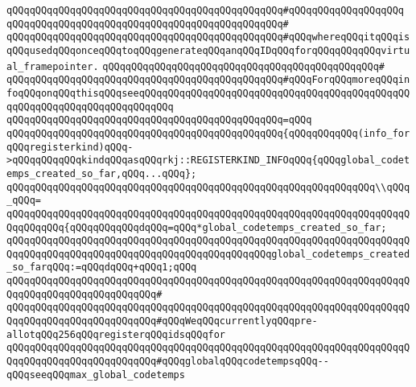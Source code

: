 \verb|qQQqqQQqqQQqqQQqqQQqqQQqqQQqqQQqqQQqqQQqqQQqqQQq#qQQqqQQqqQQqqQQqqQQq|\newline
\verb|qQQqqQQqqQQqqQQqqQQqqQQqqQQqqQQqqQQqqQQqqQQqqQQq#|\newline
\verb|qQQqqQQqqQQqqQQqqQQqqQQqqQQqqQQqqQQqqQQqqQQqqQQq#qQQqwhereqQQqitqQQqisqQQqusedqQQqonceqQQqtoqQQqgenerateqQQqanqQQqIDqQQqforqQQqqQQqqQQqvirtual_framepointer.|\newline
\verb|qQQqqQQqqQQqqQQqqQQqqQQqqQQqqQQqqQQqqQQqqQQqqQQq#|\newline
\verb|qQQqqQQqqQQqqQQqqQQqqQQqqQQqqQQqqQQqqQQqqQQqqQQq#qQQqForqQQqmoreqQQqinfoqQQqonqQQqthisqQQqseeqQQqqQQqqQQqqQQqqQQqqQQqqQQqqQQqqQQqqQQqqQQqqQQqqQQqqQQqqQQqqQQqqQQqqQQqqQQq|\newline
\verb|qQQqqQQqqQQqqQQqqQQqqQQqqQQqqQQqqQQqqQQqqQQqqQQq=qQQq|\newline
\verb|qQQqqQQqqQQqqQQqqQQqqQQqqQQqqQQqqQQqqQQqqQQqqQQq{qQQqqQQqqQQq(info_forqQQqregisterkind)qQQq->qQQqqQQqqQQqkindqQQqasqQQqrkj::REGISTERKIND_INFOqQQq{qQQqglobal_codetemps_created_so_far,qQQq...qQQq};|\newline
\newline
\verb|qQQqqQQqqQQqqQQqqQQqqQQqqQQqqQQqqQQqqQQqqQQqqQQqqQQqqQQqqQQqqQQq\\qQQq_qQQq=|\newline
\verb|qQQqqQQqqQQqqQQqqQQqqQQqqQQqqQQqqQQqqQQqqQQqqQQqqQQqqQQqqQQqqQQqqQQqqQQqqQQqqQQq{qQQqqQQqqQQqdqQQq=qQQq*global_codetemps_created_so_far;|\newline
\verb|qQQqqQQqqQQqqQQqqQQqqQQqqQQqqQQqqQQqqQQqqQQqqQQqqQQqqQQqqQQqqQQqqQQqqQQqqQQqqQQqqQQqqQQqqQQqqQQqqQQqqQQqqQQqqQQqqQQqglobal_codetemps_created_so_farqQQq:=qQQqdqQQq+qQQq1;qQQq|\newline
\verb|qQQqqQQqqQQqqQQqqQQqqQQqqQQqqQQqqQQqqQQqqQQqqQQqqQQqqQQqqQQqqQQqqQQqqQQqqQQqqQQqqQQqqQQqqQQqqQQq#|\newline
\verb|qQQqqQQqqQQqqQQqqQQqqQQqqQQqqQQqqQQqqQQqqQQqqQQqqQQqqQQqqQQqqQQqqQQqqQQqqQQqqQQqqQQqqQQqqQQqqQQq#qQQqWeqQQqcurrentlyqQQqpre-allotqQQq256qQQqregisterqQQqidsqQQqfor|\newline
\verb|qQQqqQQqqQQqqQQqqQQqqQQqqQQqqQQqqQQqqQQqqQQqqQQqqQQqqQQqqQQqqQQqqQQqqQQqqQQqqQQqqQQqqQQqqQQqqQQq#qQQqglobalqQQqcodetempsqQQq--qQQqseeqQQqmax_global_codetemps|\newline
